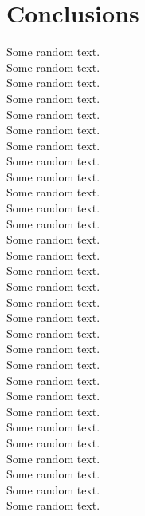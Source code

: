 \chapter{Conclusions}

Some random text.\\
Some random text.\\
Some random text.\\
Some random text.\\
Some random text.\\
Some random text.\\
Some random text.\\
Some random text.\\
Some random text.\\
Some random text.\\
Some random text.\\
Some random text.\\
Some random text.\\
Some random text.\\
Some random text.\\
Some random text.\\
Some random text.\\
Some random text.\\
Some random text.\\
Some random text.\\
Some random text.\\
Some random text.\\
Some random text.\\
Some random text.\\
Some random text.\\
Some random text.\\
Some random text.\\
Some random text.\\
Some random text.\\
Some random text.\\
  
